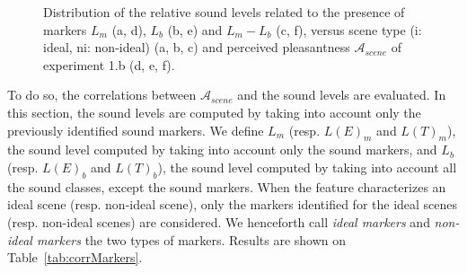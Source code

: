 \documentclass[12pt]{elsarticle}
\begin{document}
\begin{figure}[t]
        \caption{Distribution of the relative sound levels related to the presence of markers $L_m$ (a, d), $L_b$ (b, e) and $L_m-L_b$ (c, f), versus scene type (i: ideal, ni: non-ideal) (a, b, c) and perceived pleasantness $\mathcal{A}_{scene}$ of experiment 1.b (d, e, f).}\label{fig:soundlevelMarker}
\end{figure}


To do so, the correlations between $\mathcal{A}_{scene}$ and the sound levels are evaluated. In this section, the sound levels are computed by taking into account only the previously identified sound markers. We define $L_m$ (resp. $L(E)_m$ and $L(T)_m$), the sound level computed by taking into account only the sound markers, and $L_b$ (resp. $L(E)_b$ and $L(T)_b$), the sound level computed by taking into account all the sound classes, except the sound markers. When the feature characterizes an ideal scene (resp. non-ideal scene), only the markers identified for the ideal scenes (resp. non-ideal scenes) are considered. We henceforth call \emph{ideal markers} and \emph{non-ideal markers} the two types of markers. Results are shown on Table~\ref{tab:corrMarkers}.
\end{document}
